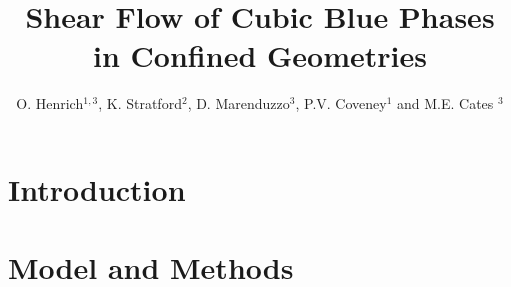 \documentclass[12pt]{iopart}
\begin{document}
\title[]{Shear Flow of Cubic Blue Phases in Confined Geometries}

\author{O. Henrich$^{1,3}$, K. Stratford$^2$, D. Marenduzzo$^3$, P.V. Coveney$^1$ and M.E. Cates $^3$}

\address{$^1$ Centre for Computational Science, University College London, UK\\$^2$ Edinburgh Parallel Computing Centre, University of Edinburgh, UK\\$^3$ School of Physics and Astronomy, University of Edinburgh, UK}

\begin{abstract}
\end{abstract}

\maketitle

\section{Introduction}
\section{Model and Methods}

\end{document}
